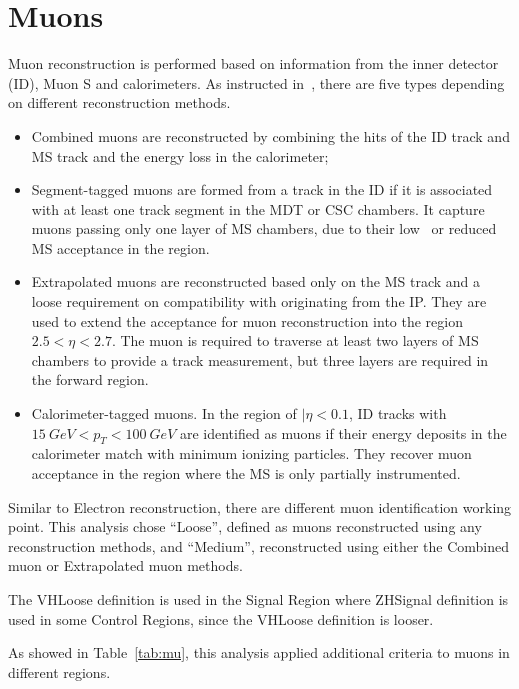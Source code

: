 \section{Muons}
\label{sec:mu}
\par Muon reconstruction is performed based on information from the inner detector (ID), Muon S and calorimeters. As instructed in~\cite{Aad:2016jkr}, 
there are five types depending on different reconstruction methods.

\begin{itemize}
\item Combined muons are reconstructed by combining the hits of the ID track and MS track and the energy loss in the calorimeter;
\item Segment-tagged muons are formed from a track in the ID if it is associated with at least one track segment in the MDT or CSC chambers. 
 It capture muons passing only one layer of MS chambers, due to their low \pt~or reduced MS acceptance in the region.
\item Extrapolated muons are reconstructed based only on the MS track and a loose requirement on compatibility with originating from the IP. 
 They are used to extend the acceptance for muon reconstruction into the region $2.5 <\eta< 2.7$. 
 The muon is required to traverse at least two layers of MS chambers to provide a track measurement, but three layers are required in the forward region.

\item Calorimeter-tagged muons. In the region of $|\eta< 0.1$, ID tracks with $15 ~GeV < p_T < 100 ~GeV$ are identified as muons if their energy deposits in the calorimeter 
 match with minimum ionizing particles. They recover muon acceptance in the region where the MS is only partially instrumented.

\end{itemize}
\par Similar to Electron reconstruction, there are different muon identification working point. This analysis chose ``Loose'', defined as muons reconstructed using any reconstruction methods, 
and ``Medium'', reconstructed using either the Combined muon or Extrapolated muon methods.
\par The VHLoose definition is used in the Signal Region where ZHSignal definition is used in some Control Regions, since the VHLoose definition is looser.					
\par As showed in Table~\ref{tab:mu}, this analysis applied additional criteria to muons in different regions. 
